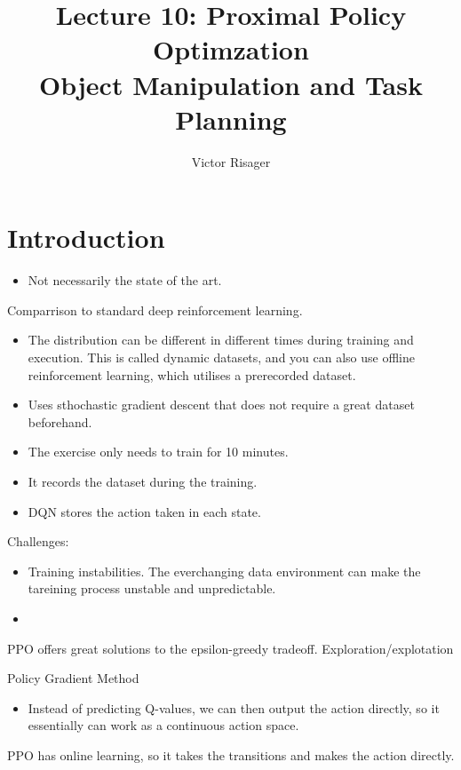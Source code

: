 \documentclass[a4paper]{article}
\title{Lecture 10: Proximal Policy Optimzation \\
	\large Object Manipulation and Task Planning}
\author{Victor Risager}
\begin{document}
\maketitle
\section{Introduction}
\begin{itemize}
	\item Not necessarily the state of the art. 
\end{itemize}
Comparrison to standard deep reinforcement learning. 
\begin{itemize}
	\item The distribution can be different in different times during training and execution. This is called dynamic datasets, and you can also use offline reinforcement learning, which utilises a prerecorded dataset. 
	\item Uses sthochastic gradient descent that does not require a great dataset beforehand. 
	\item The exercise only needs to train for 10 minutes. 	
	\item It records the dataset during the training. 
	\item DQN stores the action taken in each state.
\end{itemize}
Challenges:
\begin{itemize}
	\item Training instabilities. The everchanging data environment can make the tareining process unstable and unpredictable. 
	\item 
\end{itemize}

PPO offers great solutions to the epsilon-greedy tradeoff. Exploration/explotation

Policy Gradient Method
\begin{itemize}
	\item Instead of predicting Q-values, we can then output the action directly, so it essentially can work as a continuous action space.
\end{itemize}

PPO has online learning, so it takes the transitions and makes the action directly. 
\end{document}
